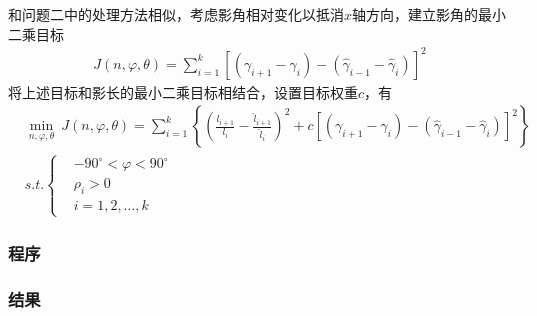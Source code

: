             和问题二中的处理方法相似，考虑影角相对变化以抵消$x$轴方向，建立影角的最小二乘目标
            \begin{align*}
            J({n,\varphi,\theta}) = \sum_{i=1}^k [(\gamma_{i+1}-\gamma_i)- (\hat{\gamma}_{i-1}-\hat{\gamma}_i)]^2
            \end{align*}
            将上述目标和影长的最小二乘目标相结合，设置目标权重$c$，有
            \begin{align*}
            & \min_{n,\varphi,\theta} \ J({n,\varphi,\theta}) = \sum_{i=1}^k\left\{ \left( \frac{l_{i+1}}{l_i} - \frac{\hat{l}_{i+1}}{\hat{l}_i} \right) ^2+c[(\gamma_{i+1}-\gamma_i)- (\hat{\gamma}_{i-1}-\hat{\gamma}_i)]^2 \right\}\\
            & s.t.\left\{
            \begin{aligned}
            & -90^\circ<\varphi<90^\circ\\
            & \rho_i>0\\
            & i=1,2,\dots,k
            \end{aligned}
            \right.
            \end{align*}

        \subsubsection{程序}
        \subsubsection{结果}
